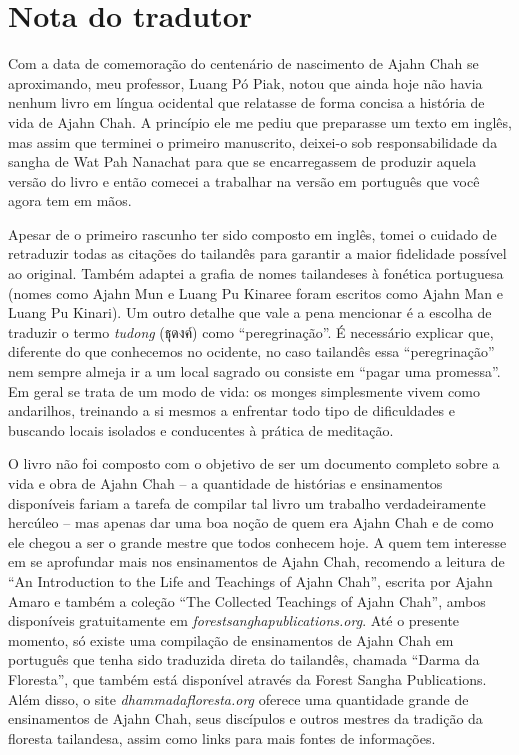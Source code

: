 \chapter{Nota do tradutor}

Com a data de comemoração do centenário de nascimento de Ajahn Chah se
aproximando, meu professor, Luang Pó Piak, notou que ainda hoje não
havia nenhum livro em língua ocidental que relatasse de forma concisa a
história de vida de Ajahn Chah. A princípio ele me pediu que preparasse
um texto em inglês, mas assim que terminei o primeiro manuscrito,
deixei-o sob responsabilidade da sangha de Wat Pah Nanachat para que se
encarregassem de produzir aquela versão do livro e então comecei a
trabalhar na versão em português que você agora tem em mãos.

Apesar de o primeiro rascunho ter sido composto em inglês, tomei o
cuidado de retraduzir todas as citações do tailandês para garantir a
maior fidelidade possível ao original. Também adaptei a grafia de nomes
tailandeses à fonética portuguesa (nomes como Ajahn Mun e Luang Pu
Kinaree foram escritos como Ajahn Man e Luang Pu Kinari). Um outro
detalhe que vale a pena mencionar é a escolha de traduzir o termo
\emph{tudong} (ธุดงค์) como ``peregrinação''. É necessário explicar que,
diferente do que conhecemos no ocidente, no caso tailandês essa
``peregrinação'' nem sempre almeja ir a um local sagrado ou consiste em
``pagar uma promessa''. Em geral se trata de um modo de vida: os monges
simplesmente vivem como andarilhos, treinando a si mesmos a enfrentar
todo tipo de dificuldades e buscando locais isolados e conducentes à
prática de meditação.

O livro não foi composto com o objetivo de ser um documento completo
sobre a vida e obra de Ajahn Chah -- a quantidade de histórias e
ensinamentos disponíveis fariam a tarefa de compilar tal livro um
trabalho verdadeiramente hercúleo -- mas apenas dar uma boa noção de
quem era Ajahn Chah e de como ele chegou a ser o grande mestre que todos
conhecem hoje. A quem tem interesse em se aprofundar mais nos
ensinamentos de Ajahn Chah, recomendo a leitura de ``An Introduction to
the Life and Teachings of Ajahn Chah'', escrita por Ajahn Amaro e também
a coleção ``The Collected Teachings of Ajahn Chah'', ambos disponíveis
gratuitamente em \emph{forestsanghapublications.org}. Até o presente
momento, só existe uma compilação de ensinamentos de Ajahn Chah em
português que tenha sido traduzida direta do tailandês, chamada ``Darma
da Floresta'', que também está disponível através da Forest Sangha
Publications. Além disso, o site \emph{dhammadafloresta.org} oferece uma
quantidade grande de ensinamentos de Ajahn Chah, seus discípulos e
outros mestres da tradição da floresta tailandesa, assim como links para
mais fontes de informações.

